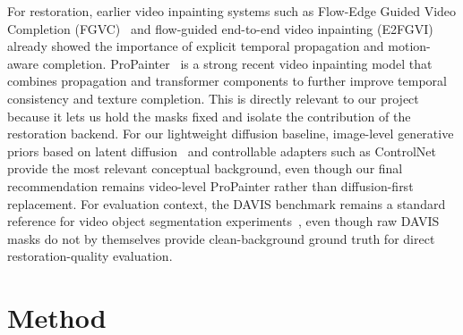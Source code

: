 \documentclass[10pt,twocolumn,letterpaper]{article}
\begin{document}
For restoration, earlier video inpainting systems such as Flow-Edge Guided Video Completion (FGVC)~\cite{gao2020fgvc} and flow-guided end-to-end video inpainting (E2FGVI)~\cite{li2022e2fgvi} already showed the importance of explicit temporal propagation and motion-aware completion.
ProPainter~\cite{zhou2023propainter} is a strong recent video inpainting model that combines propagation and transformer components to further improve temporal consistency and texture completion.
This is directly relevant to our project because it lets us hold the masks fixed and isolate the contribution of the restoration backend.
For our lightweight diffusion baseline, image-level generative priors based on latent diffusion~\cite{rombach2022ldm} and controllable adapters such as ControlNet~\cite{zhang2023controlnet} provide the most relevant conceptual background, even though our final recommendation remains video-level ProPainter rather than diffusion-first replacement.
For evaluation context, the DAVIS benchmark remains a standard reference for video object segmentation experiments~\cite{perazzi2016davis}, even though raw DAVIS masks do not by themselves provide clean-background ground truth for direct restoration-quality evaluation.

\section{Method}
\end{document}
